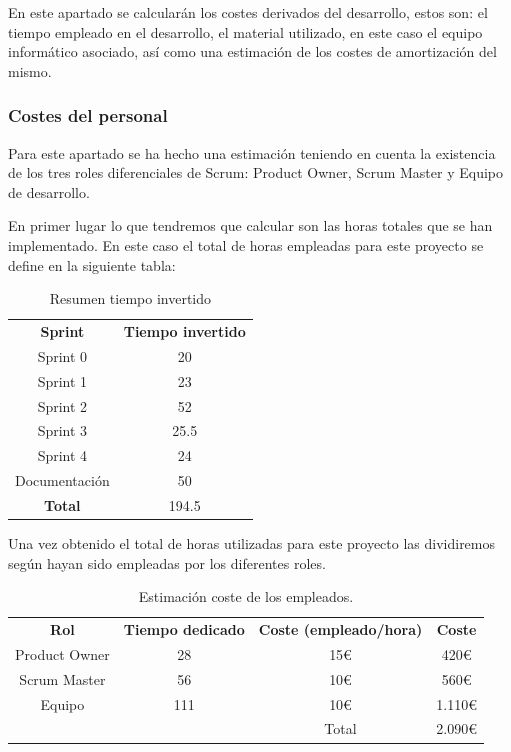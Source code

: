 En este apartado se calcularán los costes derivados del desarrollo, estos son: el tiempo empleado en el desarrollo, el material utilizado, en este caso el equipo informático asociado, así como una estimación de los costes de amortización del mismo.

\subsubsection{Costes del personal}

Para este apartado se ha hecho una estimación teniendo en cuenta la existencia de los tres roles diferenciales de Scrum: Product Owner, Scrum Master y Equipo de desarrollo.

En primer lugar lo que tendremos que calcular son las horas totales que se han implementado. En este caso el total de horas empleadas para este proyecto se define en la siguiente tabla:

\begin{table}[H]
	\begin{center}
		\begin{tabular}{| c | c |}
			\hline
			
			\textbf{Sprint} & \textbf{Tiempo invertido} \\
			Sprint 0 & 20 \\
			Sprint 1 & 23 \\
			Sprint 2 & 52 \\
			Sprint 3 & 25.5 \\
			Sprint 4 & 24 \\
			Documentación & 50 \\
			\textbf{Total} & 194.5 \\ \hline
		\end{tabular}
		\caption{Resumen tiempo invertido}

	\end{center}
\end{table} 

Una vez obtenido el total de horas utilizadas para este proyecto las dividiremos según hayan sido empleadas por los diferentes roles.

\begin{table}[H]
	\begin{center}
		\begin{tabular}{| c | c | c | c |}
			\hline
			
			\textbf{Rol} & \textbf{Tiempo dedicado} & \textbf{Coste (empleado/hora)} & \textbf{Coste} \\
			Product Owner & 28 & 15€ & 420€ \\
			Scrum Master & 56 & 10€ & 560€ \\
			Equipo & 111 & 10€ & 1.110€ \\
			 &  & Total & 2.090€ \\ \hline
		\end{tabular}
		\caption{Estimación coste de los empleados.}
	\end{center}
\end{table}

